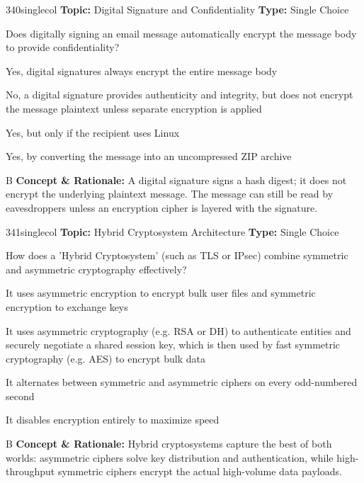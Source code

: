 \begin{qcard}{340}{singlecol}
\textcolor{darkslate!75}{\small\textbf{Topic:} Digital Signature and Confidentiality \hfill \textbf{Type:} Single Choice}\vspace{0.4em}\par
Does digitally signing an email message automatically encrypt the message body to provide confidentiality?
\begin{qoptions}
\item Yes, digital signatures always encrypt the entire message body
\item No, a digital signature provides authenticity and integrity, but does not encrypt the message plaintext unless separate encryption is applied
\item Yes, but only if the recipient uses Linux
\item Yes, by converting the message into an uncompressed ZIP archive
\end{qoptions}
\end{qcard}
\nopagebreak
\begin{explainbox}{B}
\textbf{Concept \& Rationale:} A digital signature signs a hash digest; it does not encrypt the underlying plaintext message. The message can still be read by eavesdroppers unless an encryption cipher is layered with the signature.
\end{explainbox}

\begin{qcard}{341}{singlecol}
\textcolor{darkslate!75}{\small\textbf{Topic:} Hybrid Cryptosystem Architecture \hfill \textbf{Type:} Single Choice}\vspace{0.4em}\par
How does a 'Hybrid Cryptosystem' (such as TLS or IPsec) combine symmetric and asymmetric cryptography effectively?
\begin{qoptions}
\item It uses asymmetric encryption to encrypt bulk user files and symmetric encryption to exchange keys
\item It uses asymmetric cryptography (e.g. RSA or DH) to authenticate entities and securely negotiate a shared session key, which is then used by fast symmetric cryptography (e.g. AES) to encrypt bulk data
\item It alternates between symmetric and asymmetric ciphers on every odd-numbered second
\item It disables encryption entirely to maximize speed
\end{qoptions}
\end{qcard}
\nopagebreak
\begin{explainbox}{B}
\textbf{Concept \& Rationale:} Hybrid cryptosystems capture the best of both worlds: asymmetric ciphers solve key distribution and authentication, while high-throughput symmetric ciphers encrypt the actual high-volume data payloads.
\end{explainbox}

